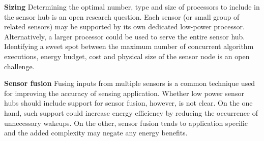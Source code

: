 {\bf Sizing} Determining the optimal number, type and size of
processors to include in the sensor hub is an open research question.
Each sensor (or small group of related sensors) may be supported by
its own dedicated low-power processor. Alternatively, a larger
processor could be used to serve the entire sensor hub.  Identifying a
sweet spot between the maximum number of concurrent algorithm
executions, energy budget, cost and physical size of the sensor node
is an open challenge.

{\bf Sensor fusion} Fusing inputs from multiple sensors is a common
technique used for improving the accuracy of sensing application.
Whether low power sensor hubs should include support for sensor
fusion, however, is not clear.  On the one hand, such support could
increase energy efficiency by reducing the occurrence of unnecessary
wakeups.  On the other, sensor fusion tends to application specific
and the added complexity may negate any energy benefits.


